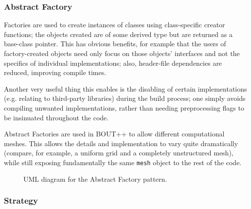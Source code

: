 \subsubsection{Abstract Factory}\label{sec:abstract_factory}

Factories are used to create instances of classes using class-specific creator functions; the objects created are of some derived type but are returned as a base-class pointer.  
This has obvious benefits, for example that the users of factory-created objects need only focus on those objects' interfaces and not the specifics of individual implementations; also, header-file dependencies are reduced, improving compile times.

Another very useful thing this enables is the disabling of certain implementations (e.g. relating to third-party libraries) during the build process; one simply avoids compiling unwanted implementations, rather than needing preprocessing flags to be insinuated throughout the code.

Abstract Factories are used in BOUT++ to allow different computational meshes.
This allows the details and implementation to vary quite dramatically (compare,
for example, a uniform grid and a completely unstructured mesh), while still
exposing fundamentally the same \texttt{mesh} object to the rest of the code.


\begin{figure}
\centerline{}
\caption{\label{fig:abstractfactoryuml}
UML diagram for the Abstract Factory pattern.}
\end{figure}

\subsubsection{Strategy}\label{sec:strategy}


